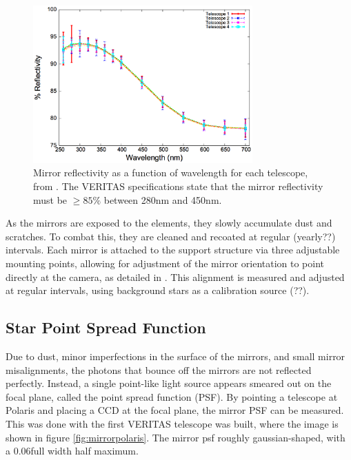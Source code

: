 \begin{figure}[ht]
  \begin{center}
    \includegraphics[width=0.75\textwidth]{images/mirror_reflect}
    \caption[Mirror Reflectivity]{Mirror reflectivity as a function of wavelength for each telescope, from \cite{mirrorfacets}.  The VERITAS specifications state that the mirror reflectivity must be $\geq 85\%$ between 280nm and 450nm.}\label{fig:mirreflect}
  \end{center}
\end{figure}

As the mirrors are exposed to the elements, they slowly accumulate dust and scratches.
To combat this, they are cleaned and recoated at regular (yearly??) intervals.
Each mirror is attached to the support structure via three adjustable mounting points, allowing for adjustment of the mirror orientation to point directly at the camera, as detailed in \cite{mirroralign}.
This alignment is measured and adjusted at regular intervals, using background stars as a calibration source (??).


\subsection{Star Point Spread Function}

Due to dust, minor imperfections in the surface of the mirrors, and small mirror misalignments, the photons that bounce off the mirrors are not reflected perfectly.
Instead, a single point-like light source appears smeared out on the focal plane, called the point spread function (PSF).
By pointing a telescope at Polaris and placing a CCD at the focal plane, the mirror PSF can be measured.
This was done with the first VERITAS telescope was built, where the image is shown in figure \ref{fig:mirrorpolaris}.
The mirror psf roughly gaussian-shaped, with a 0.06\degree full width half maximum\cite{Veritas_Detector}.

